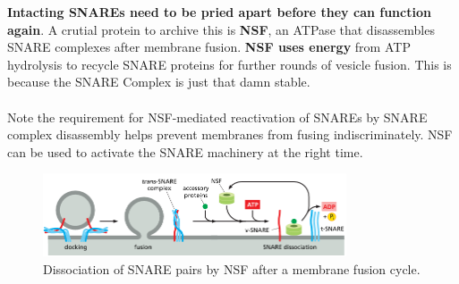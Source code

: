 \documentclass[../main.tex]{subfiles}
\begin{document}
\begin{figure}[H]
	\centering
	\caption{}
\end{figure}

\textbf{Intacting SNAREs need to be pried apart before they can function again}. A crutial protein to archive this is \textbf{\gls{NSF}}, an ATPase that disassembles SNARE complexes after membrane fusion. \textbf{NSF uses energy} from ATP hydrolysis to recycle SNARE proteins for further rounds of vesicle fusion. This is because the SNARE Complex is just that damn stable.\\
\\  
Note the requirement for NSF-mediated reactivation of SNAREs by SNARE complex disassembly helps prevent membranes from fusing indiscriminately. NSF can be used to activate the SNARE machinery at the right time.   
\begin{figure}[H]
	\centering
	\includegraphics[width=0.8\textwidth]{14}
	\caption{Dissociation of SNARE pairs by NSF after a membrane fusion cycle.}
\end{figure}
	
\end{document}
